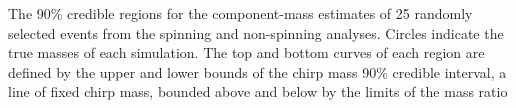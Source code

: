 The 90\% credible regions for the component-mass estimates of 25 randomly selected events from the spinning and non-spinning analyses.  Circles indicate the true masses of each simulation.  The top and bottom curves of each region are defined by the upper and lower bounds of the chirp mass 90\% credible interval, a line of fixed chirp mass, bounded above and below by the limits of the mass ratio